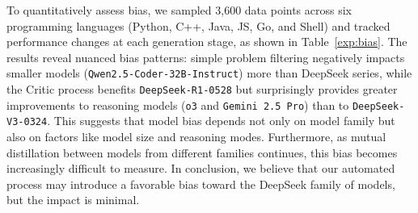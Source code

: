 To quantitatively assess bias, we sampled 3,600 data points across six programming languages (Python, C++, Java, JS, Go, and Shell) and tracked performance changes at each generation stage, as shown in Table~\ref{exp:bias}. The results reveal nuanced bias patterns: simple problem filtering negatively impacts smaller models (\texttt{Qwen2.5-Coder-32B-Instruct}) more than DeepSeek series, while the Critic process benefits \texttt{DeepSeek-R1-0528} but surprisingly provides greater improvements to reasoning models (\texttt{o3} and \texttt{Gemini 2.5 Pro}) than to \texttt{DeepSeek-V3-0324}. This suggests that model bias depends not only on model family but also on factors like model size and reasoning modes.  Furthermore, as mutual distillation between models from different families continues, this bias becomes increasingly difficult to measure. In conclusion, we believe that our automated process may introduce a favorable bias toward the DeepSeek family of models, but the impact is minimal.
